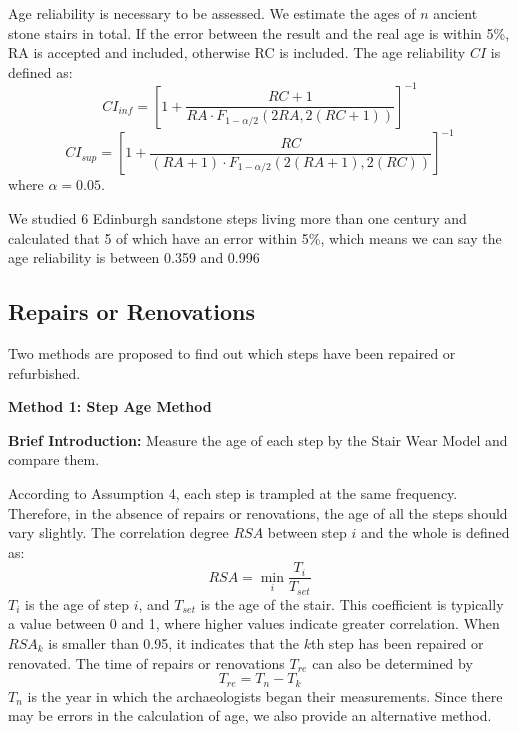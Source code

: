 \documentclass[12pt]{article}  %
\numberwithin{equation}{section} %
\begin{document}
Age reliability is necessary to be assessed. We estimate the ages of $n$ ancient stone stairs in total. If the error between the result and the real age is within 5\%, RA is accepted and included, otherwise RC is included. The age reliability $CI$ is defined as:
\begin{equation}
   CI_{inf} = {\left[ 1 + \frac{RC + 1}{RA\cdot F_{1-\alpha/2}(2RA, 2(RC+ 1))} \right]}^{-1}
\end{equation}
\begin{equation}
   CI_{sup} = {\left[ 1 + \frac{RC}{(RA+1)\cdot F_{1-\alpha/2}(2(RA+1), 2(RC))} \right]}^{-1}
\end{equation}
where $\alpha=0.05$. 

We studied 6 Edinburgh sandstone steps living more than one century and calculated that 5 of which have an error within 5\%, which means we can say the age reliability is between 0.359 and 0.996

\subsection{Repairs or Renovations }
Two methods are proposed to find out which steps have been repaired or refurbished.

\textbf{Method 1: Step Age Method}

\textbf{Brief Introduction:} Measure the age of each step by the Stair Wear Model and compare them.

According to Assumption 4, each step is trampled at the same frequency. Therefore, in the absence of repairs or renovations, the age of all the steps should vary slightly. The correlation degree $RSA$ between step $i$ and the whole is defined as:
\begin{equation}
    RSA = \min_{i} \frac{T_i}{T_{set}}
\end{equation}
$T_i$ is the age of step $i$, and $T_{set}$ is the age of the stair. This coefficient is typically a value between 0 and 1, where higher values indicate greater correlation. When $RSA_k$ is smaller than 0.95, it indicates that the $k$th step has been repaired or renovated. The time of repairs or renovations $T_{re}$ can also be determined by
\begin{equation}
    T_{re} = T_{n}-T_k
\end{equation}
$T_n$ is the year in which the archaeologists began their measurements.  Since there may be errors in the calculation of age, we also provide an alternative method.
\end{document}
